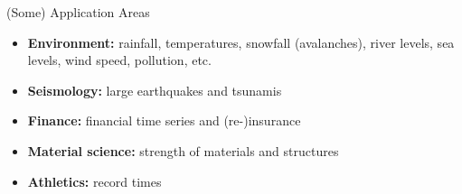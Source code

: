 \documentclass[10pt, hyperref={colorlinks = true,linkcolor = blue}]{beamer}
\begin{document}
{%

\begin{frame}{(Some) Application Areas}
\begin{itemize}
    \item \textbf{Environment:} rainfall, temperatures, snowfall (avalanches), river levels, sea levels, wind speed, pollution, etc.
    \item \textbf{Seismology:} large earthquakes and tsunamis
    \item \textbf{Finance:} financial time series and (re-)insurance
    \item \textbf{Material science:} strength of materials and structures
    \item \textbf{Athletics:} record times
\end{itemize}
\end{frame}

}
\end{document}

